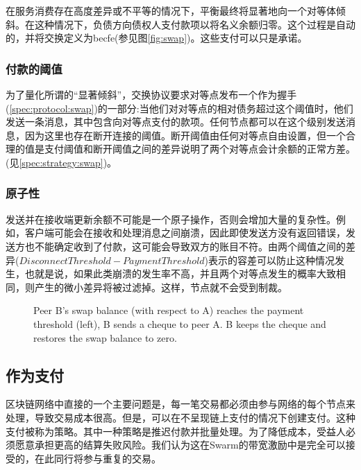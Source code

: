 在服务消费存在高度差异或不平等的情况下，平衡最终将显著地向一个对等体倾斜。在这种情况下，负债方向债权人支付款项以将名义余额归零。这个过程是自动的，并将交换定义为becfe(参见图\ref{fig:swap})。这些支付可以只是承诺。


\subsubsection{付款的阈值}

为了量化所谓的“显著倾斜”，交换协议要求对等点发布一个作为握手(\ref{spec:protocol:swap})的一部分:当他们对对等点的相对债务超过这个阈值时，他们发送一条消息，其中包含向对等点支付的款项。任何节点都可以在这个级别发送消息，因为这里也存在断开连接的阈值。断开阈值由任何对等点自由设置，但一个合理的值是支付阈值和断开阈值之间的差异说明了两个对等点会计余额的正常方差。(见\ref{spec:strategy:swap})。 


\subsubsection{原子性}

发送并在接收端更新余额不可能是一个原子操作，否则会增加大量的复杂性。例如，客户端可能会在接收和处理消息之间崩溃，因此即使发送方没有返回错误，发送方也不能确定收到了付款，这可能会导致双方的账目不符。由两个阈值之间的差异($\mathit{DisconnectThreshold}-\mathit{PaymentThreshold}$)表示的容差可以防止这种情况发生，也就是说，如果此类崩溃的发生率不高，并且两个对等点发生的概率大致相同，则产生的微小差异将被过滤掉。这样，节点就不会受到制裁。

\begin{center}
\begin{figure}[htbp]

\caption[Cheque swap \statusgreen]{Peer B's swap balance (with respect to A) reaches the payment threshold (left),
B sends a cheque to peer A. B keeps the cheque and restores the swap balance to zero.}
\label{fig:chequeswap}
\end{figure}
\end{center}

\subsection{作为支付}\label{sec:cheques}

区块链网络中直接的一个主要问题是，每一笔交易都必须由参与网络的每个节点来处理，导致交易成本很高。但是，可以在不呈现链上支付的情况下创建支付。这种支付被称为策略。其中一种策略是推迟付款并批量处理。为了降低成本，受益人必须愿意承担更高的结算失败风险。我们认为这在Swarm的带宽激励中是完全可以接受的，在此同行将参与重复的交易。


